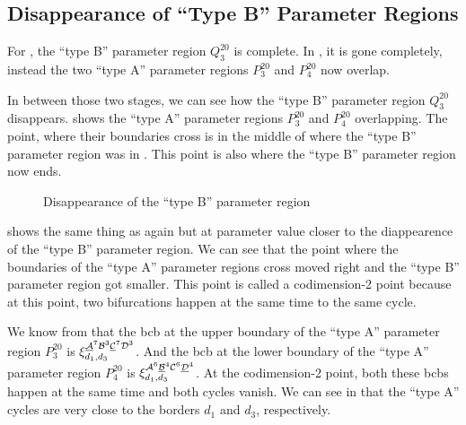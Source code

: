 \subsection{Disappearance of ``Type B'' Parameter Regions}
\label{sec.change.disb}

For , the ``type B'' parameter region $Q^{20}_3$ is complete.
In , it is gone completely, instead the two ``type A'' parameter regions $P^{20}_3$ and $P^{20}_4$ now overlap.

In between those two stages, we can see how the ``type B'' parameter region $Q^{20}_3$ disappears.
 shows the ``type A'' parameter regions $P^{20}_3$ and $P^{20}_4$ overlapping.
The point, where their boundaries cross is in the middle of where the ``type B'' parameter region was in .
This point is also where the ``type B'' parameter region now ends.

\begin{figure}
	\centering
	\caption{Disappearance of the ``type B'' parameter region}
\end{figure}

 shows the same thing as  again but at parameter value closer to the diappearence of the ``type B'' parameter region.
We can see that the point where the boundaries of the ``type A'' parameter regions cross moved right and the ``type B'' parameter region got smaller.
This point is called a codimension-2 point because at this point, two bifurcations happen at the same time to the same cycle.

We know from  that the \gls{bcb} at the upper boundary of the ``type A'' parameter region $P^{20}_3$ is $\xi_{d_1, d_3}^{\underline{\mathcal{A}}^7\mathcal{B}^3\underline{\mathcal{C}}^7\mathcal{D}^3}$.
And the \gls{bcb} at the lower boundary of the ``type A'' parameter region $P^{20}_4$ is $\xi_{d_1, d_3}^{\mathcal{A}^6\underline{\mathcal{B}}^4\mathcal{C}^6\underline{\mathcal{D}}^4}$.
At the codimension-2 point, both these \glspl{bcb} happen at the same time and both cycles vanish.
We can see in  that the ``type A'' cycles are very close to the borders $d_1$ and $d_3$, respectively.


